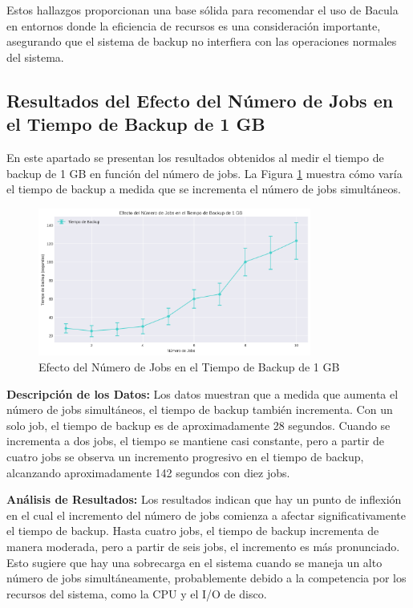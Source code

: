 Estos hallazgos proporcionan una base sólida para recomendar el uso de Bacula en entornos donde la eficiencia de recursos es una consideración importante, asegurando que el sistema de backup no interfiera con las operaciones normales del sistema.



\subsection{Resultados del Efecto del Número de Jobs en el Tiempo de Backup de 1 GB}

En este apartado se presentan los resultados obtenidos al medir el tiempo de backup de 1 GB en función del número de jobs. La Figura \ref{fig:efecto-numero-jobs} muestra cómo varía el tiempo de backup a medida que se incrementa el número de jobs simultáneos.

\begin{figure}[H]
    \centering
    \includegraphics[width=0.8\textwidth]{efecto_numero_jobs.png}
    \caption{Efecto del Número de Jobs en el Tiempo de Backup de 1 GB}
    \label{fig:efecto-numero-jobs}
\end{figure}

\textbf{Descripción de los Datos:}
Los datos muestran que a medida que aumenta el número de jobs simultáneos, el tiempo de backup también incrementa. Con un solo job, el tiempo de backup es de aproximadamente 28 segundos. Cuando se incrementa a dos jobs, el tiempo se mantiene casi constante, pero a partir de cuatro jobs se observa un incremento progresivo en el tiempo de backup, alcanzando aproximadamente 142 segundos con diez jobs.

\textbf{Análisis de Resultados:}
Los resultados indican que hay un punto de inflexión en el cual el incremento del número de jobs comienza a afectar significativamente el tiempo de backup. Hasta cuatro jobs, el tiempo de backup incrementa de manera moderada, pero a partir de seis jobs, el incremento es más pronunciado. Esto sugiere que hay una sobrecarga en el sistema cuando se maneja un alto número de jobs simultáneamente, probablemente debido a la competencia por los recursos del sistema, como la CPU y el I/O de disco.

